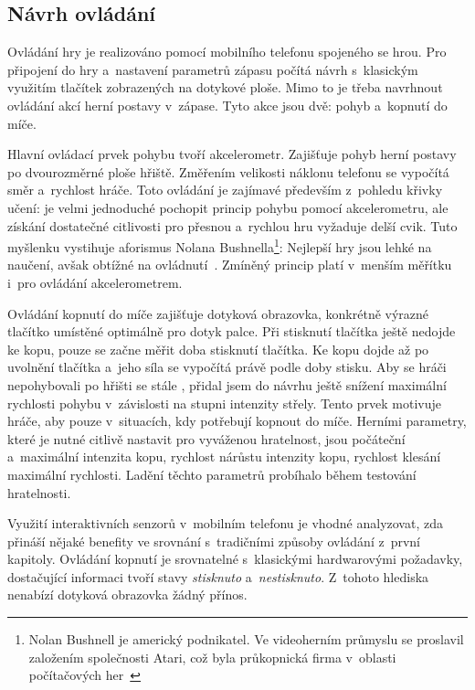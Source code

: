\documentclass[thesis=B,czech,hidelinks]{FITthesis}[2012/06/26] %
\begin{document}
\subsection{Návrh ovládání}

Ovládání hry je realizováno pomocí mobilního telefonu spojeného se hrou. Pro připojení do hry a~nastavení parametrů zápasu počítá návrh s~klasickým využitím tlačítek zobrazených na dotykové ploše. Mimo to je třeba navrhnout ovládání akcí herní postavy v~zápase. Tyto akce jsou dvě: pohyb a~kopnutí do míče.

Hlavní ovládací prvek pohybu tvoří akcelerometr. Zajišťuje pohyb herní postavy po dvourozměrné ploše hřiště. Změřením velikosti náklonu telefonu se vypočítá směr a~rychlost hráče. Toto ovládání je zajímavé především z~pohledu křivky učení: je velmi jednoduché pochopit princip pohybu pomocí akcelerometru, ale získání dostatečné citlivosti pro přesnou a~rychlou hru vyžaduje delší cvik. Tuto myšlenku vystihuje aforismus Nolana Bushnella\footnote{Nolan Bushnell je americký podnikatel. Ve videoherním průmyslu se proslavil založením společnosti Atari, což byla průkopnická firma v~oblasti počítačových her~\cite{atari}}: Nejlepší hry jsou lehké na naučení, avšak obtížné na ovládnutí~\cite{atari}. Zmíněný princip platí v~menším měřítku i~pro ovládání akcelerometrem.

Ovládání kopnutí do míče zajišťuje dotyková obrazovka, konkrétně výrazné tlačítko umístěné optimálně pro dotyk palce. Při stisknutí tlačítka ještě nedojde ke kopu, pouze se začne měřit doba stisknutí tlačítka. Ke kopu dojde až po uvolnění tlačítka a~jeho síla se vypočítá právě podle doby stisku. Aby se hráči nepohybovali po hřišti se stále , přidal jsem do návrhu ještě snížení maximální rychlosti pohybu v~závislosti na stupni intenzity střely. Tento prvek motivuje hráče, aby  pouze v~situacích, kdy potřebují kopnout do míče. Herními parametry, které je nutné citlivě nastavit pro vyváženou hratelnost, jsou počáteční a~maximální intenzita kopu, rychlost nárůstu intenzity kopu, rychlost klesání maximální rychlosti. Ladění těchto parametrů probíhalo během testování hratelnosti.

Využití interaktivních senzorů v~mobilním telefonu je vhodné analyzovat, zda přináší nějaké benefity ve srovnání s~tradičními způsoby ovládání z~první kapitoly. Ovládání kopnutí je srovnatelné s~klasickými hardwarovými požadavky, dostačující informaci tvoří stavy \textit{stisknuto} a~\textit{nestisknuto}. Z~tohoto hlediska nenabízí dotyková obrazovka žádný přínos.
\end{document}
